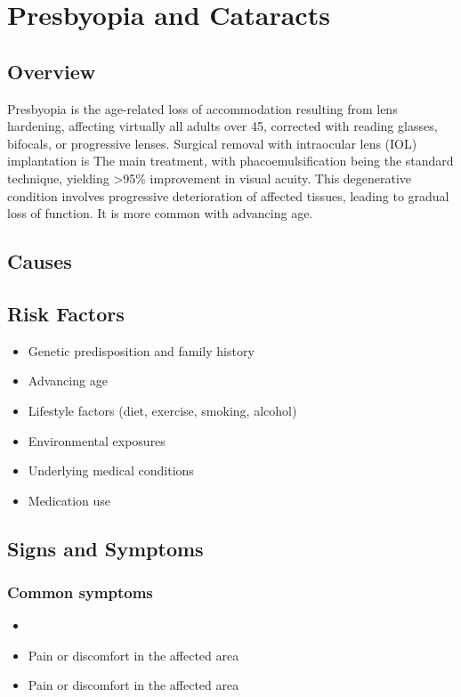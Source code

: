 \chapter{Presbyopia and Cataracts}
\label{sec:Presbyopia and Cataracts}

\section{Overview}
Presbyopia is the age-related loss of accommodation resulting from lens hardening, affecting virtually all adults over 45, corrected with reading glasses, bifocals, or progressive lenses. Surgical removal with intraocular lens (IOL) implantation is The main treatment, with phacoemulsification being the standard technique, yielding >95\% improvement in visual acuity. This degenerative condition involves progressive deterioration of affected tissues, leading to gradual loss of function. It is more common with advancing age.
\section{Causes}
\section{Risk Factors}

\begin{itemize}[noitemsep]
  \item Genetic predisposition and family history
  \item Advancing age
  \item Lifestyle factors (diet, exercise, smoking, alcohol)
  \item Environmental exposures
  \item Underlying medical conditions
  \item Medication use
\end{itemize}
\section{Signs and Symptoms}

\subsection{Common symptoms}
\begin{itemize}[noitemsep]
  \item \item Pain or discomfort in the affected area    \item Pain or discomfort in the affected area
  \end{itemize}

